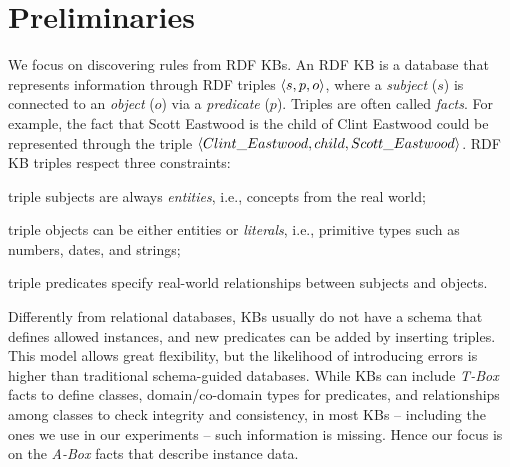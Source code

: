 \vspace{-0.5ex}
\section{Preliminaries}%
\label{sec:krd_prel}
We focus on discovering rules from RDF KBs. An RDF KB is
a database that represents information through RDF triples $\langle s,p,o\rangle$, where a \emph{subject} ($s$) is connected to an \emph{object} ($o$) via a \emph{predicate} ($p$). Triples are often called \emph{facts}. For example, the fact that Scott Eastwood is the child of Clint Eastwood could be represented through the triple $\langle Clint\_Eastwood,child,Scott\_Eastwood\rangle$. 
RDF KB triples respect three constraints:
\begin{inparaenum}[(i)]
	\item triple subjects are always \emph{entities}, i.e., concepts from the real world;
	\item triple objects can be either entities or \emph{literals}, i.e.,  primitive types such as numbers, dates, and strings;
	\item triple predicates specify real-world relationships between subjects and objects.
\end{inparaenum}

Differently from relational databases, KBs usually do not have a schema that defines allowed instances,
and new predicates can be added by inserting triples. %
This model allows great flexibility, but the likelihood of introducing errors is higher than traditional schema-guided databases.
While KBs can include \emph{T-Box} facts to define classes, domain/co-domain types for predicates, and relationships among classes
to check integrity and consistency, in most KBs -- including the ones we use in our experiments -- such information is missing. %
Hence our focus is on the \emph{A-Box} facts that describe instance data. 

\vspace{-1ex}
